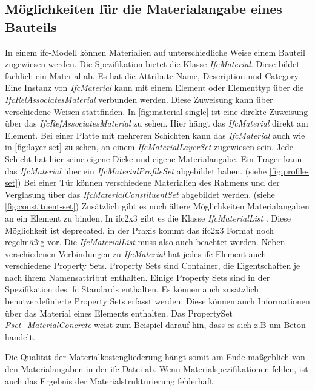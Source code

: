 \subsection{Möglichkeiten für die Materialangabe eines Bauteils}
\label{c:basics:ifc:buildingmaterial}
In einem \ac{ifc}-Modell können Materialien auf unterschiedliche Weise einem Bauteil zugewiesen werden. Die Spezifikation bietet die Klasse \textit{IfcMaterial}. Diese bildet fachlich ein Material ab. Es hat die Attribute Name, Description und Category.\citep[vgl.][]{ifc_material} Eine Instanz von \textit{IfcMaterial} kann mit einem Element oder Elementtyp über die \textit{IfcRelAssociatesMaterial} verbunden werden. Diese Zuweisung kann über verschiedene Weisen stattfinden. In \autoref{fig:material-single} ist eine direkte Zuweisung über das \textit{IfcRefAssociatesMaterial} zu sehen. Hier hängt das \textit{IfcMaterial} direkt am Element. 
Bei einer Platte mit mehreren Schichten kann das \textit{IfcMaterial} auch wie in \autoref{fig:layer-set} zu sehen, an einem \textit{IfcMaterialLayerSet} zugewiesen sein. Jede Schicht hat hier seine eigene Dicke und eigene Materialangabe. Ein Träger kann das \textit{IfcMaterial} über ein \textit{IfcMaterialProfileSet} abgebildet haben. (siehe \autoref{fig:profile-set}) Bei einer Tür können verschiedene Materialien des Rahmens und der Verglasung über das \textit{IfcMaterialConstituentSet} abgebildet werden. (siehe \autoref{fig:constituent-set}) \citep[vgl.][]{ifc_material_association} Zusätzlich gibt es noch ältere Möglichkeiten Materialangaben an ein Element zu binden. In \ac{ifc2x3} gibt es die Klasse \textit{IfcMaterialList} \citep[vgl.][]{Thomas2007_MaterialList}. Diese Möglichkeit ist deprecated, in der Praxis kommt das \ac{ifc2x3} Format noch regelmäßig vor. Die \textit{IfcMaterialList} muss also auch beachtet werden. Neben verschiedenen Verbindungen zu \textit{IfcMaterial} hat jedes \ac{ifc}-Element auch verschiedene Property Sets. Property Sets sind Container, die Eigentschaften je nach ihrem Namensattribut enthalten. Einige Property Sets sind in der Spezifikation des \ac{ifc} Standards enthalten. Es können auch zusätzlich benutzerdefinierte Property Sets erfasst werden. Diese können auch Informationen über das Material eines Elements enthalten. \citep[vgl.][]{ifc_property_set} Das PropertySet \textit{Pset\_MaterialConcrete} weist zum Beispiel darauf hin, dass es sich z.B um Beton handelt.

Die Qualität der Materialkostengliederung hängt somit am Ende maßgeblich von den Materialangaben in der \ac{ifc}-Datei ab. Wenn Materialspezifikationen fehlen, ist auch das Ergebnis der Materialstrukturierung fehlerhaft.

